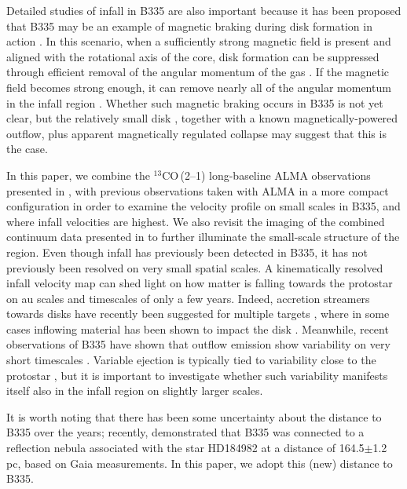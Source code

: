\documentclass{aa}
\newcommand{\trettenco}{$^{13}$CO\xspace}
\begin{document}
Detailed studies of infall in B335 are also important because it has been proposed that B335 may be an example of magnetic braking during disk formation in action \citep[e.g.][]{Yen:2018rt,Maury:2018qf,Cabedo:2023aa}. In this scenario, when a sufficiently strong magnetic field is present and aligned with the rotational axis of the core, disk formation can be suppressed through efficient removal of the angular momentum of the gas \citep[e.g.][]{Galli:1993oq, Galli:1993qe,Allen:2003mf, Li:2014jm,Wurster:2018re}. If the magnetic field becomes strong enough, it can remove nearly all of the angular momentum in the infall region \citep{Galli:2006jr}. Whether such magnetic braking occurs in B335 is not yet clear, but the relatively small disk \citep{Yen:2015vf, Bjerkeli:2019ip}, together with a known magnetically-powered outflow, plus apparent magnetically regulated collapse \citep{Maury:2018qf} may suggest that this is the case. 

In this paper, we combine the \trettenco\,(2--1) long-baseline ALMA observations presented in \citet{Bjerkeli:2019ip}, with previous observations taken with ALMA in a more compact configuration in order to examine the velocity profile on small scales in B335, and where infall velocities are highest. We also revisit the imaging of the combined continuum data presented in \citet{Bjerkeli:2019ip} to further illuminate the small-scale structure of the region. Even though infall has previously been detected in B335, it has not previously been resolved on very small spatial scales. A kinematically resolved infall velocity map can shed light on how matter is falling towards the protostar on au scales and timescales of only a few years. Indeed, accretion streamers towards disks have recently been suggested for multiple targets \citep[e.g.][]{Alves:2020vo, Segura-Cox:2020wc, Pineda:2020xm, Valdivia-Mena:2022aa}, where in some cases inflowing material has been shown to impact the disk \citep[e.g.][]{Garufi:2022aa}. Meanwhile, recent observations of B335 have shown that outflow emission show variability on very short timescales \citep[e.g.][]{Bjerkeli:2019ip}. Variable ejection is typically tied to variability close to the protostar \citep{Audard:2014xy}, but it is important to investigate whether such variability manifests itself also in the infall region on slightly larger scales. 

It is worth noting that there has been some uncertainty about the distance to B335 over the years; recently, \citet{Watson:2020wp} demonstrated that B335 was connected to a reflection nebula associated with the star HD184982 at a distance of 164.5$\pm$1.2 pc, based on Gaia measurements. In this paper, we adopt this (new) distance to B335.
\end{document}
